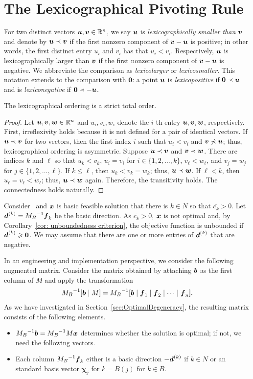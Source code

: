 \section{The Lexicographical Pivoting Rule}\label{sec:lexi}
For two distinct vectors ${\boldsymbol u}, {\boldsymbol v} \in \mathbb R^n$, we say ${\boldsymbol u}$ is {\em lexicographically smaller than} ${\boldsymbol v}$ and denote by ${\boldsymbol u}\prec {\boldsymbol v}$ if the first nonzero component of ${\boldsymbol v} - {\boldsymbol u}$ is positive; in other words, the first distinct entry $u_i$ and $v_i$ has that $u_i < v_i$. Respectively, ${\boldsymbol u}$ is lexicographically larger than ${\boldsymbol v}$ if the first nonzero component of ${\boldsymbol v}-{\boldsymbol u}$ is negative. We abbreviate the comparison as {\em lexicolarger} or {\em lexicosmaller}. This notation extends to the comparison with $\bm0$: a point ${\boldsymbol u}$ is {\em lexicopositive} if $\boldsymbol0\prec {\boldsymbol u}$ and is {\em lexiconegative} if $\boldsymbol0 \prec - {\boldsymbol u}$.  

\begin{lemma}
The lexicographical ordering is a strict total order. 
\end{lemma}
\begin{proof}
Let ${\boldsymbol u}, {\boldsymbol v}, {\boldsymbol w} \in \mathbb R^n$ and $u_i, v_i, w_i$ denote the $i$-th entry ${\boldsymbol u}, {\boldsymbol v}, {\boldsymbol w}$, respectively. First, irreflexivity holds because it is not defined for a pair of identical vectors. If ${\boldsymbol u} \prec {\boldsymbol v}$ for two vectors, then the first index $i$ such that $u_i < v_i$ and ${\boldsymbol v}\not\prec{\boldsymbol u}$; thus, lexicographical ordering is asymmetric. Suppose ${\boldsymbol u}\prec{\boldsymbol v}$ and ${\boldsymbol v}\prec{\boldsymbol w}$. There are indices $k$ and $\ell$ so that $u_k < v_k$, $u_i = v_i$ for $i\in\{1, 2, \dots, k\}$, $v_\ell < w_\ell$, and $v_j = w_j$ for $j \in \{1, 2, \dots, \ell\}$. If $k\leq \ell$, then $u_k < v_k = w_k$; thus, ${\boldsymbol u}\prec{\boldsymbol w}$. If $\ell < k$, then $u_\ell = v_\ell < w_\ell$; thus, ${\boldsymbol u}\prec {\boldsymbol w}$ again. Therefore, the transitivity holds. The connectedness holds naturally. 
\end{proof}

Consider \LPSA~and ${\boldsymbol x}$ is basic feasible solution that there is $k\in N$ so that $\overline{c_k} > 0$. Let ${\boldsymbol d}^{(k)} = {M_B}^{-1} {\boldsymbol f}_k$ be the basic direction. As $\overline{c_k} > 0$, ${\boldsymbol x}$ is not optimal and, by Corollary~\ref{cor: unboundedness criterion}, the objective function is unbounded if ${\boldsymbol d}^{(k)} \geqslant \boldsymbol0$. We may assume that there are one or more entries of ${\boldsymbol d}^{(k)}$ that are negative.  

In an engineering and implementation perspective, we consider the following augmented matrix. Consider the matrix obtained by attaching ${\boldsymbol b}$ as the first column of $M$ and apply the transformation
\[ {M_B}^{-1} [{\boldsymbol b} \mid M] = {M_B}^{-1} [{\boldsymbol b} \mid {\boldsymbol f}_1 \mid {\boldsymbol f}_2 \mid \dots \mid {\boldsymbol f}_n]. \]
As we have investigated in Section~\ref{sec:OptimalDegeneracy}, the resulting matrix consists of the following elements. 
\begin{itemize}
\item ${M_B}^{-1} {\boldsymbol b} = {M_B}^{-1} M {\boldsymbol x}$ determines whether the solution is optimal; if not, we need the following vectors. 
\item  Each column ${M_B}^{-1} {\boldsymbol f}_k$ either is a basic direction $- {\boldsymbol d}^{(k)}$ if $k\in N$ or an standard basis vector $\bm\chi_j$ for $k = B(j) $ for $k\in B$. 
\end{itemize}

